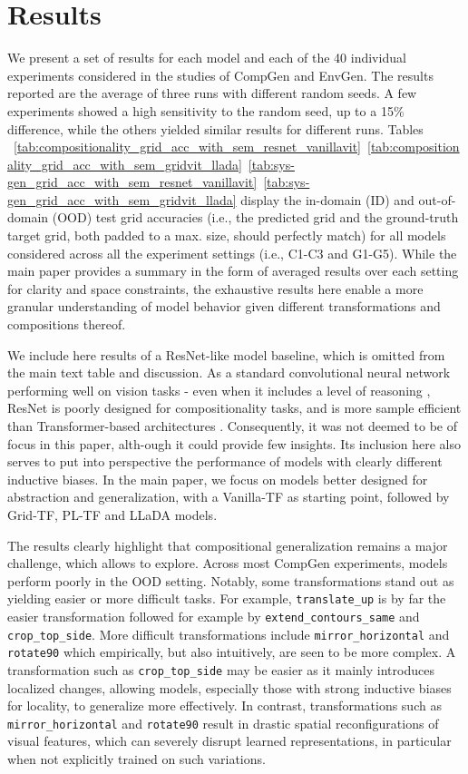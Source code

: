 \section{Results}
We present a set of results for each model and each of the 40 individual experiments considered in the studies of CompGen and EnvGen. The results reported are the average of three runs with different random seeds. A few experiments showed a high sensitivity to the random seed, up to a 15\% difference, while the others yielded similar results for different runs. Tables ~\ref{tab:compositionality_grid_acc_with_sem_resnet_vanillavit}~\ref{tab:compositionality_grid_acc_with_sem_gridvit_llada}~\ref{tab:sys-gen_grid_acc_with_sem_resnet_vanillavit}~\ref{tab:sys-gen_grid_acc_with_sem_gridvit_llada} display the in-domain (ID) and out-of-domain (OOD) test grid accuracies (i.e., the predicted grid and the ground-truth target grid, both padded to a max. size, should perfectly match) for all models considered across all the experiment settings (i.e., C1-C3 and G1-G5). While the main paper provides a summary in the form of averaged results over each setting for clarity and space constraints, the exhaustive results here enable a more granular understanding of model behavior given different transformations and compositions thereof.

We include here results of a ResNet-like model baseline, which is omitted from the main text table and discussion. As a standard convolutional neural network performing well on vision tasks - even when it includes a level of reasoning \citep{cvr2022}, ResNet is poorly designed for compositionality tasks, and is more sample efficient than Transformer-based architectures \citep{cvr2022}. Consequently, it was not deemed to be of focus in this paper, alth-ough it could provide few insights. Its inclusion here also serves to put into perspective the performance of models with clearly different inductive biases. In the main paper, we focus on models better designed for abstraction and generalization, with a Vanilla-TF as starting point, followed by Grid-TF, PL-TF and LLaDA models.

The results clearly highlight that compositional generalization remains a major challenge, which \generatorName \; allows to explore. Across most CompGen experiments, models perform poorly in the OOD setting. Notably, some transformations stand out as yielding easier or more difficult tasks. For example, \texttt{translate\_up} is by far the easier transformation followed for example by \texttt{extend\_contours\_same} and \texttt{crop\_top\_side}. More difficult transformations include \texttt{mirror\_horizontal} and \texttt{rotate90} which empirically, but also intuitively, are seen to be more complex. A transformation such as \texttt{crop\_top\_side} may be easier as it mainly introduces localized changes, allowing models, especially those with strong inductive biases for locality, to generalize more effectively. In contrast, transformations such as \texttt{mirror\_horizontal} and \texttt{rotate90} result in drastic spatial reconfigurations of visual features, which can severely disrupt learned representations, in particular when not explicitly trained on such variations.

